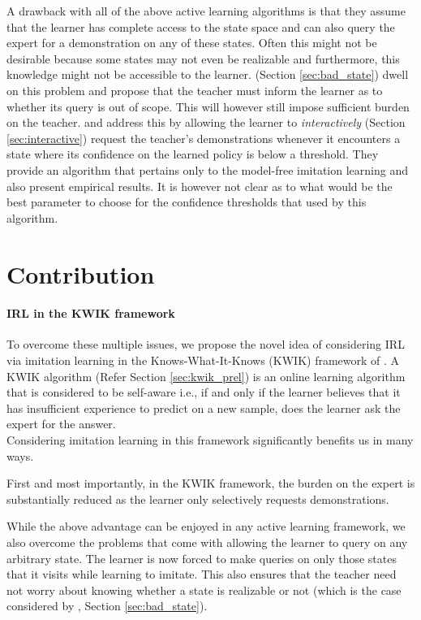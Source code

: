 A drawback with all of the above active learning algorithms is that they assume that the learner has complete access to the state space and can also query the expert for a demonstration on any of these states. Often this might not be desirable because some states may not even be realizable and furthermore, this knowledge might not be accessible to the learner. \citet{judah2011active} (Section \ref{sec:bad_state}) dwell on this problem and propose that the teacher must inform the learner as to whether its query is out of scope. This will however still impose sufficient burden on the teacher. 
\citet{Chernova:2009:IPL:1622716.1622717} and \citet{Chernova:2007:CPL:1329125.1329407} address this by allowing the learner to \textit{interactively} (Section \ref{sec:interactive}) request the teacher's demonstrations whenever it encounters a state where its confidence on the learned policy is below a threshold. They provide an algorithm that pertains only to the model-free imitation learning  and also present empirical results. It is however not clear as to what would be the best parameter to choose for the confidence thresholds that used by this algorithm. 



\section{Contribution}

\paragraph{IRL in the KWIK framework}
To overcome these multiple issues, we propose the novel idea of considering IRL via imitation learning in the Knows-What-It-Knows (KWIK) framework of \citet{Li:2011:KKF:1968770.1968789}. A KWIK algorithm (Refer Section \ref{sec:kwik_prel}) is an online learning algorithm that is considered to be self-aware i.e., if and only if the learner believes that it has insufficient experience to predict on a new sample, does the learner ask the expert for the answer. \\

Considering imitation learning in this framework significantly benefits us in many ways.

First and most importantly, in the KWIK framework, the burden on the expert is substantially reduced as the learner only selectively requests demonstrations. 

While the above advantage can be enjoyed in any active learning framework, we  also overcome the problems that come with allowing the learner to query on any arbitrary state. The learner is now forced to make queries on only those states that it visits while learning to imitate. This also ensures that the teacher need not worry about knowing whether a state is realizable or not (which is the case considered by \citet{judah2011active}, Section \ref{sec:bad_state}).


